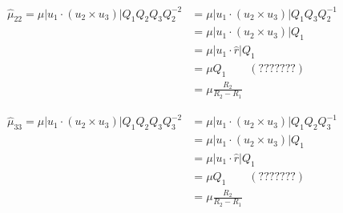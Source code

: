 \documentclass{amsart}
\begin{document}
\begin{align*}
  \hat{\mu}_{22}=\mu|u_1\cdot(u_2\times u_3)|Q_1Q_2Q_3Q_2^{-2}
  &=\mu|u_1\cdot(u_2\times u_3)|Q_1Q_3Q_2^{-1}\\
  &=\mu|u_1\cdot(u_2\times u_3)|Q_1\\
  &=\mu|u_1\cdot\hat{r}|Q_1\\
  &=\mu Q_1\qquad (???????)\\
  &=\mu \frac{R_2}{R_2-R_1}
\end{align*}

\begin{align*}
  \hat{\mu}_{33}=\mu|u_1\cdot(u_2\times u_3)|Q_1Q_2Q_3Q_3^{-2}
  &=\mu|u_1\cdot(u_2\times u_3)|Q_1Q_2Q_3^{-1}\\
  &=\mu|u_1\cdot(u_2\times u_3)|Q_1\\
  &=\mu|u_1\cdot\hat{r}|Q_1\\
  &=\mu Q_1\qquad (???????)\\
  &=\mu \frac{R_2}{R_2-R_1}
\end{align*}

\end{document}
